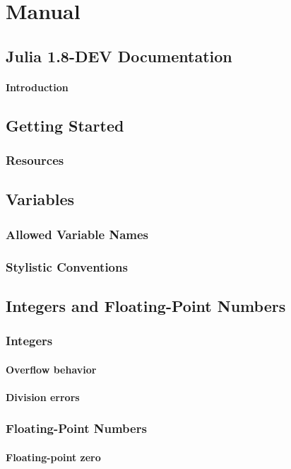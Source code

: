\part{Manual}
  \chapter{Julia 1.8-DEV Documentation}
    \subsection{Introduction}
  \chapter{Getting Started}
    \section{Resources}
  \chapter{Variables}
    \section{Allowed Variable Names}
    \section{Stylistic Conventions}
  \chapter{Integers and Floating-Point Numbers}
    \section{Integers}
    \subsection{Overflow behavior}
    \subsection{Division errors}
    \section{Floating-Point Numbers}
    \subsection{Floating-point zero}
